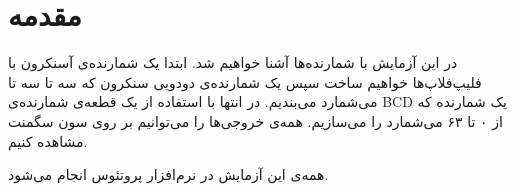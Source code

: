 \documentclass[a4paper,oneside,12pt]{book}
\title{\thesistitle}
\author{\authorname}
\begin{document}

\doublespacing

\newpage
\chapter{مقدمه}
در این آزمایش با شمارنده‌ها آشنا خواهیم شد.
ابتدا یک شمارنده‌ی آسنکرون با فلیپ‌فلاپ‌ها خواهیم ساخت سپس یک شمارنده‌ی دودویی سنکرون که سه تا سه تا می‌شمارد می‌بندیم. در انتها با استفاده از یک قطعه‌ی شمارنده‌ی
BCD
یک شمارنده که از ۰ تا ۶۳ می‌شمارد را می‌سازیم.
همه‌ی خروجی‌ها را می‌توانیم بر روی سون سگمنت مشاهده کنیم.

همه‌ی این آزمایش در نرم‌افزار پروتئوس انجام می‌شود.
\newpage \tableofcontents

\mainmatter



\end{document}
